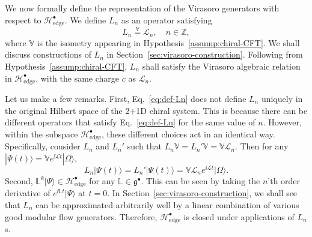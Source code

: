 \documentclass[12pt, nofootinbib]{article}
\theoremstyle{plain}
\theoremstyle{assumption}
\theoremstyle{definition}
\theoremstyle{plain}
\theoremstyle{plain}
\theoremstyle{plain}
\theoremstyle{plain}
\theoremstyle{plain}
\newcommand{\calH}{{\mathcal H}}
\def\veq{\stackrel{\mathbb{V}}{=}}
\def\Lcft{\mathscr{L}}
\def\gc{\mathfrak{g}^{\bullet}}
\def\calHc{\calH^{\bullet}_{\mathrm{edge}}}
\begin{document}
We now formally define the representation of the Virasoro generators with respect to $\calHc$. We define $L_n$ as an operator satisfying 
\begin{equation}\label{eq:def-Ln}
    L_n \veq \Lcft_n,\quad n\in \mathbb{Z},
\end{equation}
where $\mathbb{V}$ is the isometry appearing in Hypothesis~\ref{assump:chiral-CFT}. We shall discuss constructions of $L_n$ in Section~\ref{sec:virasoro-construction}. Following from Hypothesis~\ref{assump:chiral-CFT}, $L_n$ shall satisfy the Virasoro algebraic relation in $\calHc$, with the same charge $c$ as $\Lcft_n$.   

Let us make a few remarks. First, Eq.~\eqref{eq:def-Ln} does not define $L_n$ uniquely in the original Hilbert space of the 2+1D chiral system. This is because there can be different operators that satisfy Eq.~\eqref{eq:def-Ln} for the same value of $n$. However, within the subspace $\calHc$, these different choices act in an identical way. Specifically, consider $L_n$ and $L_n'$ such that $L_n\mathbb{V} = L_n'\mathbb{V} = \mathbb{V}\Lcft_n$. Then for any $|\Psi(t)\rangle = \mathbb{V}e^{\ii \Lcft t}|\Omega\rangle$, 
\begin{equation}
    L_n |\Psi(t)\rangle = L_n' |\Psi(t)\rangle = \mathbb{V} \Lcft_n e^{\ii \Lcft t}|\Omega\rangle.
\end{equation}
Second, $\mathbb{L}^k|\Psi\rangle \in \calHc$ for any $\mathbb{L}\in \gc$. This can be seen by taking the $n$'th order derivative of $e^{\ii \mathbb{L}t}|\Psi\rangle$ at $t=0$. In Section~\ref{sec:virasoro-construction}, we shall see that $L_n$ can be approximated arbitrarily well by a linear combination of various good modular flow generators. Therefore, $\calHc$ is closed under applications of $L_n$s.
\end{document}
